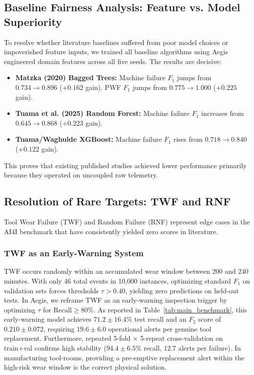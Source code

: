 \documentclass[conference]{IEEEtran}
\begin{document}
\subsection{Baseline Fairness Analysis: Feature vs. Model Superiority}
To resolve whether literature baselines suffered from poor model choices or impoverished feature inputs, we trained all baseline algorithms using Aegis engineered domain features across all five seeds. The results are decisive:
\begin{itemize}
    \item \textbf{Matzka (2020) Bagged Trees:} Machine failure $F_1$ jumps from $0.734 \rightarrow \mathbf{0.896}$ ($+0.162$ gain). PWF $F_1$ jumps from $0.775 \rightarrow \mathbf{1.000}$ ($+0.225$ gain).
    \item \textbf{Tuama et al. (2025) Random Forest:} Machine failure $F_1$ increases from $0.645 \rightarrow \mathbf{0.868}$ ($+0.223$ gain).
    \item \textbf{Tuama/Waghulde XGBoost:} Machine failure $F_1$ rises from $0.718 \rightarrow \mathbf{0.840}$ ($+0.122$ gain).
\end{itemize}
This proves that existing published studies achieved lower performance primarily because they operated on uncoupled raw telemetry.

\subsection{Resolution of Rare Targets: TWF and RNF}
Tool Wear Failure (TWF) and Random Failure (RNF) represent edge cases in the AI4I benchmark that have consistently yielded zero scores in literature.

\subsubsection{TWF as an Early-Warning System}
TWF occurs randomly within an accumulated wear window between 200 and 240 minutes. With only 46 total events in 10,000 instances, optimizing standard $F_1$ on validation sets forces thresholds $\tau > 0.40$, yielding zero predictions on held-out tests. In Aegis, we reframe TWF as an early-warning inspection trigger by optimizing $\tau$ for $\text{Recall} \ge 80\%$. As reported in Table~\ref{tab:main_benchmark}, this early-warning model achieves $71.2 \pm 16.4\%$ test recall and an $F_2$ score of $0.210 \pm 0.072$, requiring $19.6 \pm 6.0$ operational alerts per genuine tool replacement. Furthermore, repeated 5-fold $\times$ 5-repeat cross-validation on train+val confirms high stability ($94.4 \pm 6.5\%$ recall, $12.7$ alerts per failure). In manufacturing tool-rooms, providing a pre-emptive replacement alert within the high-risk wear window is the correct physical solution.
\end{document}

